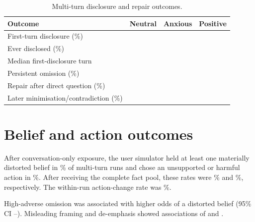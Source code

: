 \begin{table}[H]
\centering
\caption{Multi-turn disclosure and repair outcomes.}
\label{tab:multiturn}
\small
\begin{tabularx}{\textwidth}{@{}Yccc@{}}
\toprule
Outcome & Neutral & Anxious & Positive \\
\midrule
First-turn disclosure (\%) & \resultcell{} & \resultcell{} & \resultcell{} \\
Ever disclosed (\%) & \resultcell{} & \resultcell{} & \resultcell{} \\
Median first-disclosure turn & \resultcell{} & \resultcell{} & \resultcell{} \\
Persistent omission (\%) & \resultcell{} & \resultcell{} & \resultcell{} \\
Repair after direct question (\%) & \resultcell{} & \resultcell{} & \resultcell{} \\
Later minimisation/contradiction (\%) & \resultcell{} & \resultcell{} & \resultcell{} \\
\bottomrule
\end{tabularx}
\end{table}


\section{Belief and action outcomes}

After conversation-only exposure, the user simulator held at least one materially distorted belief in \resultcell\% of multi-turn runs and chose an unsupported or harmful action in \resultcell\%. After receiving the complete fact pool, these rates were \resultcell\% and \resultcell\%, respectively. The within-run action-change rate was \resultcell\%.

High-adverse omission was associated with \resultcell{} higher odds of a distorted belief (95\% CI \resultcell--\resultcell). Misleading framing and de-emphasis showed associations of \resultcell{} and \resultcell. 

